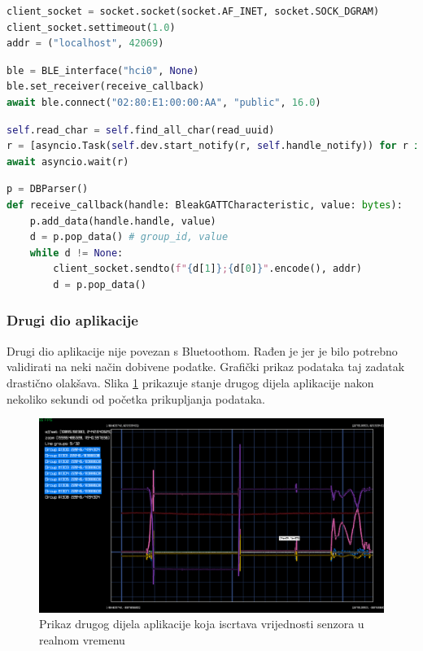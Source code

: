 \documentclass[times, utf8, diplomski]{diplomski}
\begin{document}
\begin{lstlisting}[language=python, caption={Kreiranje UDP socketa u Pythonu}, label={pyudpsock}]
client_socket = socket.socket(socket.AF_INET, socket.SOCK_DGRAM)
client_socket.settimeout(1.0)
addr = ("localhost", 42069)
\end{lstlisting}

\begin{lstlisting}[language=python, caption={Spajanje Bluetoothom na mikrokontroler}, label={pyconnect}]
ble = BLE_interface("hci0", None)
ble.set_receiver(receive_callback)
await ble.connect("02:80:E1:00:00:AA", "public", 16.0)
\end{lstlisting}

\begin{lstlisting}[language=python, caption={Pretplaćivanje na sve obavijesti sa svih servisa i karakterističnih tokova na mikrokontroleru}, label={pysubscribe}]
self.read_char = self.find_all_char(read_uuid)
r = [asyncio.Task(self.dev.start_notify(r, self.handle_notify)) for r in self.read_char]
await asyncio.wait(r)
\end{lstlisting}

\begin{lstlisting}[language=python, caption={Prosljeđivanje dobivene Bluetooth vrijednosti drugom dijelu aplikacije}, label={relay}]
p = DBParser()
def receive_callback(handle: BleakGATTCharacteristic, value: bytes):
    p.add_data(handle.handle, value)
    d = p.pop_data() # group_id, value 
    while d != None:
        client_socket.sendto(f"{d[1]};{d[0]}".encode(), addr)
        d = p.pop_data()
\end{lstlisting}

\subsubsection{Drugi dio aplikacije}
Drugi dio aplikacije nije povezan s Bluetoothom. Rađen je jer je bilo potrebno validirati na neki način dobivene podatke. Grafički prikaz podataka taj zadatak drastično olakšava. Slika \ref{fig:graph} prikazuje stanje drugog dijela aplikacije nakon nekoliko sekundi od početka prikupljanja podataka. 

\begin{figure}[H]
\includegraphics[width=\textwidth]{rlplot_allsensors_20230623_120537.png}
\centering
\caption{Prikaz drugog dijela aplikacije koja iscrtava vrijednosti senzora u realnom vremenu}
\label{fig:graph}
\end{figure}
\end{document}
